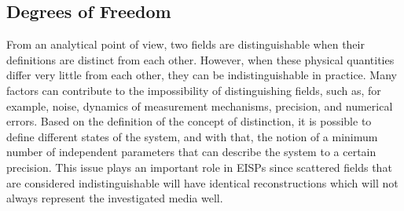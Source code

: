 			
		\subsection{Degrees of Freedom}\label{chap:problemstatement:eisp:5}
	
			From an analytical point of view, two fields are distinguishable when their definitions are distinct from each other. However, when these physical quantities differ very little from each other, they can be indistinguishable in practice. Many factors can contribute to the impossibility of distinguishing fields, such as, for example, noise, dynamics of measurement mechanisms, precision, and numerical errors. Based on the definition of the concept of distinction, it is possible to define different states of the system, and with that, the notion of a minimum number of independent parameters that can describe the system to a certain precision. This issue plays an important role in EISPs since scattered fields that are considered indistinguishable will have identical reconstructions which will not always represent the investigated media well.
			
